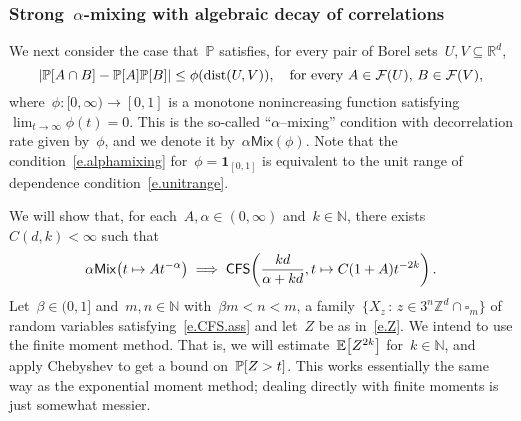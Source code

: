\documentclass[11pt,twoside]{article} %
\let\oldsquare\square %
\renewcommand{\square}{\oldsquare}
\numberwithin{equation}{section}
\theoremstyle{definition}
\let\originalleft\left
\let\originalright\right
\renewcommand{\left}{\mathopen{}\mathclose\bgroup\originalleft}
\renewcommand{\right}{\aftergroup\egroup\originalright}
\newcommand*{\N}{\ensuremath{\mathbb{N}}}
\newcommand*{\Zd}{\ensuremath{\mathbb{Z}^d}}
\newcommand*{\Rd}{\ensuremath{\mathbb{R}^d}}
\newcommand{\cu}{\square}
\newcommand{\F}{\mathcal{F}}
\renewcommand{\P}{\mathbb{P}}
\newcommand{\E}{\mathbb{E}}
\newcommand{\indc}{\boldsymbol{1}}
\DeclareMathOperator{\dist}{dist}
\newcommand{\CFS}{\mathsf{CFS}}
\begin{document}
\subsubsection{Strong~$\alpha$-mixing with algebraic decay of correlations}
We next consider the case that~$\P$ satisfies, for every pair of Borel sets~$U,V\subseteq\Rd$, 
\begin{equation}
\label{e.alphamixing}
\left| \P\left[ A\cap B\right] - \P\left[ A \right]\P\left[ B \right] \right|
\leq
\phi\left( \dist(U,V) \right),
\quad 
\mbox{for every}\ A\in \F(U),\, B\in \F(V),
\end{equation}
where~$\phi:[0,\infty) \to [0,1]$ is a monotone nonincreasing function satisfying~$\lim_{t\to \infty} \phi(t) = 0$. This is the so-called ``$\alpha$--mixing'' condition with decorrelation rate given by~$\phi$, and we denote it by~$\alpha\mathsf{Mix}(\phi)$. Note that the condition~\eqref{e.alphamixing} for~$\phi = \indc_{[0,1]}$ is equivalent to the unit range of dependence condition~\eqref{e.unitrange}. 

\smallskip

We will show that, for each~$A,\alpha \in (0,\infty)$ and~$k\in\N$, there exists~$C(d,k)<\infty$ such that 
\begin{equation} 
\label{e.alphamix.to.CFS}
\alpha\mathsf{Mix}\left(t\mapsto At^{-\alpha} \right)
\implies \CFS\left( \frac{kd}{\alpha+kd} ,t\mapsto C(1+A)t^{-2k}\right)
\,.
\end{equation}
Let~$\beta \in (0,1]$ and~$m,n\in\N$ with~$\beta m<n<m$, a family~$\{ X_z \,:\, z\in 3^n\Zd\cap \cu_m\}$ of random variables satisfying~\eqref{e.CFS.ass} and let~$Z$ be as in~\eqref{e.Z}. We intend to use the finite moment method.
That is, we will estimate~$\E\left[ Z^{2k} \right]$ for~$k\in\N$, and apply Chebyshev to get a bound on~$\P\left[ Z>t \right]$. This works essentially the same way as the exponential moment method; dealing directly with finite moments is just somewhat messier. 

\smallskip
\end{document}
